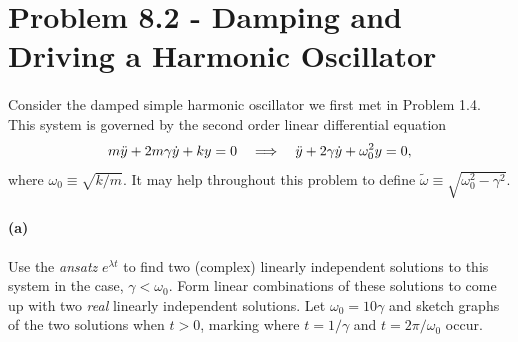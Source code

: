 \documentclass{article}
\begin{document}
\section*{Problem 8.2 - Damping and Driving a Harmonic Oscillator}

\paragraph{}
Consider the damped simple harmonic oscillator we first met in Problem 1.4.  This system is governed by the second order linear differential equation
	\begin{equation*}
		m\ddot{y} + 2m\gamma\dot{y} + ky = 0	\quad \Longrightarrow \quad		\ddot{y} + 2\gamma\dot{y} + \omega_{0}^{2}y = 0,
	\end{equation*}
where $\omega_{0} \equiv \sqrt{k/m}$.  It may help throughout this problem to define $\widetilde\omega \equiv \sqrt{\omega_{0}^{2}-\gamma^{2}}$.

\paragraph{(a)}
Use the \emph{ansatz} $e^{\lambda t}$ to find two (complex) linearly independent solutions to this system in the  case, $\gamma< \omega_{0}$.
Form linear combinations of these solutions to come up with two \emph{real} linearly independent solutions.
Let $\omega_{0} = 10\gamma$ and sketch graphs of the two solutions when $t>0$, marking where $t=1/\gamma$ and $t=2\pi/\omega_{0}$ occur.\\
\end{document}

